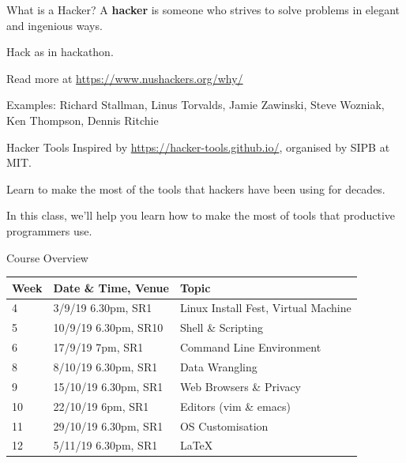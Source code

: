 \documentclass[12pt]{beamer}
\begin{document}
\begin{frame}{What is a Hacker?}
  A \textbf{hacker} is someone who strives to solve problems in elegant and ingenious ways.

  Hack as in hackathon.

  Read more at \url{https://www.nushackers.org/why/}

  Examples: Richard Stallman, Linus Torvalds, Jamie Zawinski, Steve Wozniak, Ken Thompson, Dennis Ritchie
\end{frame}

\begin{frame}{Hacker Tools}
  Inspired by \url{https://hacker-tools.github.io/}, organised by SIPB at MIT.

  Learn to make the most of the tools that hackers have been using for decades.

  In this class, we'll help you learn how to make the most of tools that productive programmers use.
\end{frame}

\begin{frame}{Course Overview}
  \begin{center}
    \begin{tabularx}{\textwidth}{l|l|X}
      \textbf{Week} & \textbf{Date \& Time, Venue} & \textbf{Topic}                      \\ \hline
      4             & 3/9/19 6.30pm, SR1           & Linux Install Fest, Virtual Machine \\ \hline
      5             & 10/9/19 6.30pm, SR10         & Shell \& Scripting                  \\ \hline
      6             & 17/9/19 7pm, SR1             & Command Line Environment            \\ \hline
      8             & 8/10/19 6.30pm, SR1          & Data Wrangling                      \\ \hline
      9             & 15/10/19 6.30pm, SR1         & Web Browsers \& Privacy             \\ \hline
      10            & 22/10/19 6pm, SR1            & Editors (vim \& emacs)              \\ \hline
      11            & 29/10/19 6.30pm, SR1         & OS Customisation                    \\ \hline
      12            & 5/11/19 6.30pm, SR1          & \LaTeX                              \\ \hline
    \end{tabularx}
  \end{center}
\end{frame}
\end{document}
